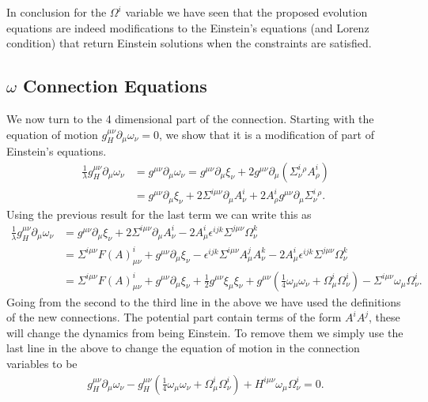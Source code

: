 \documentclass[10pt]{report}
\theoremstyle{definition}
\begin{document}
        In conclusion for the $\Omega^i$ variable we have seen that the proposed evolution equations are indeed modifications to the Einstein's equations (and Lorenz condition) that return Einstein solutions when the constraints are satisfied.

        \subsection{$\omega$ Connection Equations}
        We now turn to the 4 dimensional part of the connection. Starting with the equation of motion $g_H^{\mu\nu} \partial_\mu \omega_\nu = 0$, we show that it is a modification of part of Einstein's equations.
        \begin{align}
            \frac{1}{\lambda} g_H^{\mu\nu} \partial_\mu \omega_\nu & = g^{\mu\nu} \partial_\mu \omega_\nu = g^{\mu\nu} \partial_\mu \xi_\nu + 2 g^{\mu\nu} \partial_\mu \left( \Sigma^i_\nu{}^\rho A^i_\rho \right) \nonumber \\ & = g^{\mu\nu}\partial_\mu \xi_\nu + 2 \Sigma^{i\mu\nu} \partial_\mu A^i_\nu + 2 A^i_\rho g^{\mu\nu} \partial_\mu \Sigma^i_\nu{}^\rho.
        \end{align}
        Using the previous result for the last term we can write this as 
        \begin{align}
            \frac{1}{\lambda} g_H^{\mu\nu} \partial_\mu \omega_\nu & = g^{\mu\nu}\partial_\mu \xi_\nu + 2 \Sigma^{i\mu\nu} \partial_\mu A^i_\nu -2 A^i_\mu \epsilon^{ijk} \Sigma^{j\mu\nu} \Omega^k_\nu \\ & = \Sigma^{i\mu\nu} F(A)^i_{\mu\nu} + g^{\mu\nu} \partial_\mu \xi_\nu - \epsilon^{ijk} \Sigma^{i\mu\nu} A^j_\mu A^k_\nu - 2 A^i_\mu \epsilon^{ijk} \Sigma^{j\mu\nu} \Omega^k_\nu \nonumber \\ & = \Sigma^{i\mu\nu} F(A)^i_{\mu\nu} + g^{\mu\nu} \partial_\mu \xi_\nu + \frac{1}{2} g^{\mu\nu} \xi_\mu \xi_\nu + g^{\mu\nu} \left( \frac{1}{4} \omega_\mu \omega_\nu + \Omega^i_\mu \Omega^i_\nu \right) - \Sigma^{i\mu\nu} \omega_\mu \Omega^i_\nu.
        \end{align}
        Going from the second to the third line in the above we have used the definitions of the new connections. The potential part contain terms of the form $A^i A^j$, these will change the dynamics from being Einstein. To remove them we simply use the last line in the above to change the equation of motion in the connection variables to be
        \begin{align}
            g_H^{\mu\nu} \partial_\mu \omega_\nu - g_H^{\mu\nu} \left( \frac{1}{4} \omega_\mu \omega_\nu + \Omega^i_\mu \Omega^i_\nu \right) + H^{i\mu\nu} \omega_\mu \Omega^i_\nu = 0.
        \end{align}
\end{document}
